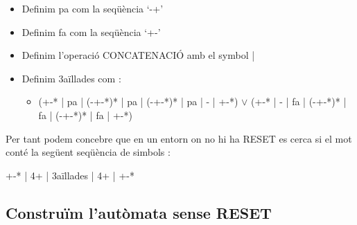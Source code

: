 \documentclass[12pt,a4paper]{report}
\begin{document}
\begin{itemize}
\item Definim pa com la seqüència ‘-+’
\item Definim fa com la seqüència ‘+-’
\item Definim l’operació CONCATENACIÓ amb el symbol | 
\item Definim 3aïllades com :
\begin{itemize}
\item ({+-}* | pa | (-{+-}*)* | pa | (-{+-}*)* | pa | - | {+-}*) $\vee$ ({+-}* | - | fa | (-{+-}*)* | fa | (-{+-}*)* | fa | {+-}*)
\end{itemize}
\end{itemize}

Per tant podem concebre que en un entorn on no hi ha RESET es cerca si el mot conté la següent seqüència de simbols : 

\begin{center}
{+-}* | 4+ | 3aïllades | 4+ | {+-}*
\end{center}

\subsection{Construïm l’autòmata sense RESET}
\end{document}
